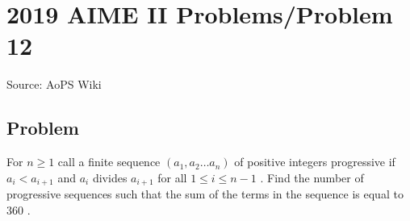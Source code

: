 \documentclass[12pt]{article}
\begin{document}
\section*{{2019 AIME II Problems/Problem 12}}
Source: AoPS Wiki

\subsection*{Problem}
For $n \ge 1$ call a finite sequence $(a_1, a_2 \ldots a_n)$ of positive integers progressive if $a_i < a_{i+1}$ and $a_i$ divides $a_{i+1}$ for all $1 \le i \le n-1$ . Find the number of progressive sequences such that the sum of the terms in the sequence is equal to $360$ .
\end{document}
